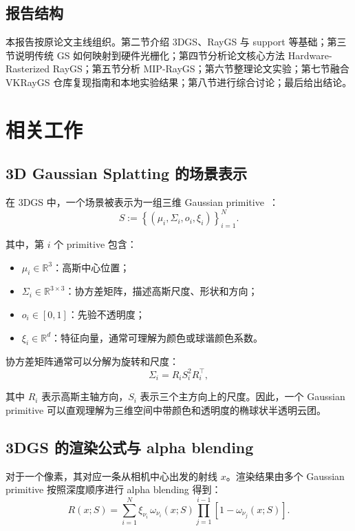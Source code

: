 \documentclass[12pt,hyperref,a4paper,UTF8]{ctexart}
\begin{document}
\subsection{报告结构}
本报告按原论文主线组织。第二节介绍 3DGS、RayGS 与 support 等基础；第三节说明传统 GS 如何映射到硬件光栅化；第四节分析论文核心方法 Hardware-Rasterized RayGS；第五节分析 MIP-RayGS；第六节整理论文实验；第七节融合 VKRayGS 仓库复现指南和本地实验结果；第八节进行综合讨论；最后给出结论。



\section{相关工作}
\subsection{3D Gaussian Splatting 的场景表示}
在 3DGS 中，一个场景被表示为一组三维 Gaussian primitive~\cite{3dgaussiansplatting}：
\begin{equation}
\displaystyle
S := \left\{ \left(\mu_i, \Sigma_i, o_i, \xi_i\right) \right\}_{i=1}^{N}.
\end{equation}

其中，第 $i$ 个 primitive 包含：

\begin{itemize}
    \item $\mu_i \in \mathbb{R}^3$：高斯中心位置；
    \item $\Sigma_i \in \mathbb{R}^{3\times 3}$：协方差矩阵，描述高斯尺度、形状和方向；
    \item $o_i \in [0,1]$：先验不透明度；
    \item $\xi_i \in \mathbb{R}^d$：特征向量，通常可理解为颜色或球谐颜色系数。
\end{itemize}

协方差矩阵通常可以分解为旋转和尺度：
\begin{equation}
\displaystyle
\Sigma_i = R_i S_i^2 R_i^\top ,
\end{equation}

其中 $R_i$ 表示高斯主轴方向，$S_i$ 表示三个主方向上的尺度。因此，一个 Gaussian primitive 可以直观理解为三维空间中带颜色和透明度的椭球状半透明云团。



\subsection{3DGS 的渲染公式与 alpha blending}
对于一个像素，其对应一条从相机中心出发的射线 $x$。渲染结果由多个 Gaussian primitive 按照深度顺序进行 alpha blending 得到：
\begin{equation}
\displaystyle
R(x;S)
=
\sum_{i=1}^{N}
\xi_{\nu_i}\,
\omega_{\nu_i}(x;S)
\prod_{j=1}^{i-1}
\left[1-\omega_{\nu_j}(x;S)\right].
\end{equation}
\end{document}
